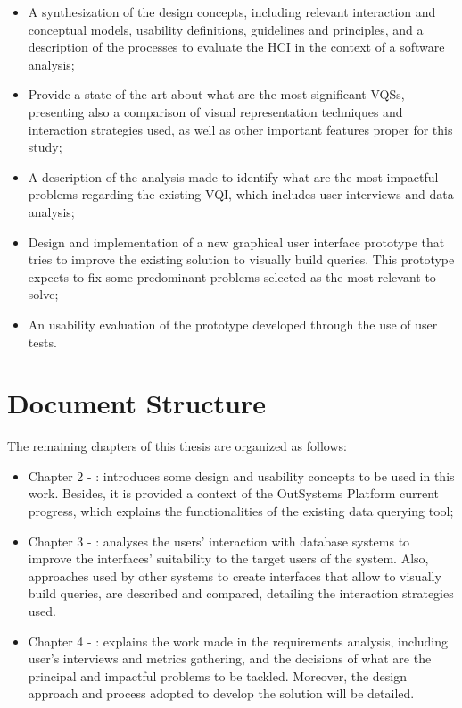 \begin{itemize}
  \item A synthesization of the design concepts, including relevant interaction and conceptual models, usability definitions, guidelines and principles, and a description of the processes to evaluate the \gls{HCI} in the context of a software analysis;
  \item Provide a state-of-the-art about what are the most significant \glspl{VQS}, presenting also a comparison of visual representation techniques and interaction strategies used, as well as other important features proper for this study;
  \item A description of the analysis made to identify what are the most impactful problems regarding the existing \gls{VQI}, which includes user interviews and data analysis;
  \item Design and implementation of a new graphical user interface prototype that tries to improve the existing solution to visually build queries. This prototype expects to fix some predominant problems selected as the most relevant to solve;
  \item An usability evaluation of the prototype developed through the use of user tests.
\end{itemize} 

\section{Document Structure}
\label{sec:document_structure}

The remaining chapters of this thesis are organized as follows:

\begin{itemize}
  \item Chapter 2 - : introduces some design and usability concepts to be used in this work. Besides, it is provided a context of the OutSystems Platform current progress, which explains the functionalities of the existing data querying tool;
  \item Chapter 3 - : analyses the users' interaction with database systems to improve the interfaces' suitability to the target users of the system. Also, approaches used by other systems to create interfaces that allow to visually build queries, are described and compared, detailing the interaction strategies used.
  \item Chapter 4 - : explains the work made in the requirements analysis, including user's interviews and metrics gathering, and the decisions of what are the principal and impactful problems to be tackled. Moreover, the design approach and process adopted to develop the solution will be detailed.
\end{itemize}

